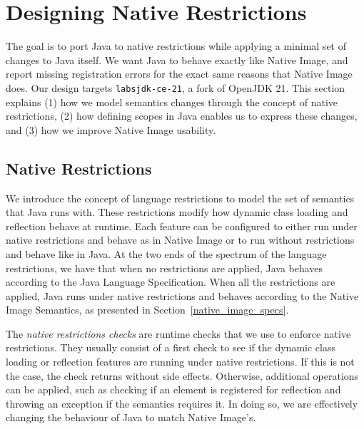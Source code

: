 \chapter{Designing Native Restrictions}

The goal is to port Java to native restrictions while applying a minimal set of changes to Java itself. We want Java to behave exactly like Native Image, and report missing registration errors for the exact same reasons that Native Image does. Our design targets \verb|labsjdk-ce-21|, a fork of OpenJDK 21. 
This section explains (1) how we model semantics changes through the concept of native restrictions, (2) how defining scopes in Java enables us to express these changes, and (3) how we improve Native Image usability.

\section{Native Restrictions}
We introduce the concept of language restrictions to model the set of semantics that Java runs with. These restrictions modify how dynamic class loading and reflection behave at runtime. Each feature can be configured to either run under native restrictions and behave as in Native Image or to run without restrictions and behave like in Java.
At the two ends of the spectrum of the language restrictions, we have that when no restrictions are applied, Java behaves according to the Java Language Specification. When all the restrictions are applied, Java runs under native restrictions and behaves according to the Native Image Semantics, as presented in Section~\ref{native_image_specs}. 

The \emph{native restrictions checks} are runtime checks that we use to enforce native restrictions. They usually consist of a first check to see if the dynamic class loading or reflection features are running under native restrictions. If this is not the case, the check returns without side effects. Otherwise, additional operations can be applied, such as checking if an element is registered for reflection and throwing an exception if the semantics requires it. In doing so, we are effectively changing the behaviour of Java to match Native Image's.

